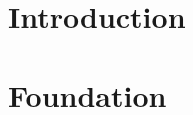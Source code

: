 \documentclass{mimosis}
\title{\texttt{\getTitleEng}}
\subtitle{\texttt{\getTitleGer}}
\author{\getAuthor{}}
\begin{document}
\frontmatter





\tableofcontents

\mainmatter
\todototoc
\listoftodos

\part[Introduction]{%
	Introduction\\
	\vspace{1cm}
}\label{part:introduction}



\part[Foundation]{%
	Foundation\\
	\vspace{1cm}
}\label{part:foundation}



\end{document}
